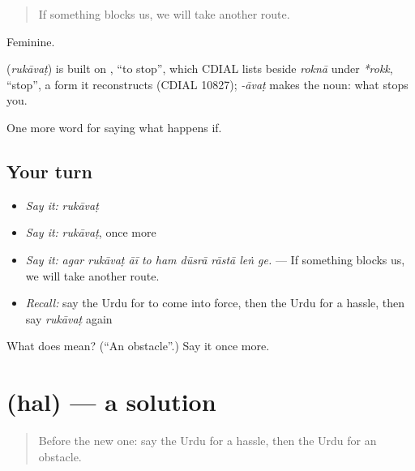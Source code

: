 \begin{quote}
If something blocks us, we will take another route.
\end{quote}

Feminine.

\begin{cousinweb}
\textbf{} (\emph{rukāvaṭ}) is built on \textbf{}, \textquotedblleft{}to stop\textquotedblright{}, which CDIAL lists beside \emph{roknā} under \emph{*rokk}, \textquotedblleft{}stop\textquotedblright{}, a form it reconstructs (CDIAL 10827); \emph{-āvaṭ} makes the noun: what stops you.
\end{cousinweb}

\begin{grammarlens}[title={What you've built}]
One more word for saying what happens if.
\end{grammarlens}

\subsection*{Your turn}
\begin{itemize}
\raggedright
  \item \emph{Say it:} \emph{rukāvaṭ}
  \item \emph{Say it:} \emph{rukāvaṭ}, once more
  \item \emph{Say it:} \emph{agar rukāvaṭ āī to ham dūsrā rāstā leṅ ge.} — If something blocks us, we will take another route.
  \item \emph{Recall:} say the Urdu for to come into force, then the Urdu for a hassle, then say \emph{rukāvaṭ} again
\end{itemize}

\begin{tcolorbox}[breakable,colback=teal!4,colframe=teal!35!black,title={Before you move on}]
What does  mean? (\textquotedblleft{}An obstacle\textquotedblright{}.) Say it once more.
\end{tcolorbox}
\section[\texorpdfstring{\ur{حل} (hal)}{حل (hal)}]{ (hal) — a solution}

\label{lesson:UR-C368-hal}



\begin{quote}
Before the new one: say the Urdu for a hassle, then the Urdu for an obstacle.
\end{quote}

